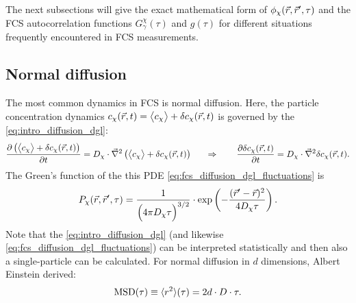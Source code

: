 The next subsections will give the exact mathematical form of $\phi_\chi(\vec{r},\vec{r}',\tau)$ and the FCS autocorrelation functions $G_{\gamma}^{\chi}(\tau)$ and $g(\tau)$ for different situations frequently encountered in FCS measurements.



\subsection{Normal diffusion}
\label{sec:NormalDiffusionFCS}
The most common dynamics in FCS is normal diffusion. Here, the particle concentration dynamics $c_\chi(\vec{r},t)=\bigl\langle c_\chi\bigr\rangle+\delta c_\chi(\vec{r},t)$ is governed by the  \eqref{eq:intro_diffusion_dgl}:
\begin{equation}\label{eq:fcs_diffusion_dgl_fluctuations}  
  \frac{\partial \left(\bigl\langle c_\chi\bigr\rangle+\delta c_\chi(\vec{r}, t)\right)}{\partial t}=D_\chi\cdot \vec{\nabla}^2\left(\bigl\langle c_\chi\bigr\rangle+\delta c_\chi(\vec{r}, t)\right)\ \ \ \ \ \Rightarrow\ \ \ \ \ \ \frac{\partial \delta c_\chi(\vec{r}, t)}{\partial t}=D_\chi\cdot \vec{\nabla}^2\delta c_\chi(\vec{r}, t).
\end{equation}
The Green's function of the this PDE \eqref{eq:fcs_diffusion_dgl_fluctuations} is
\begin{equation}\label{eq:fcs_ndiff_propagator}
  P_\chi(\vec{r},\vec{r}',\tau)=\frac{1}{\Bigl(4\pi D_\chi\tau\Bigr)^{3/2}}\cdot\exp\left(-\frac{(\vec{r}'-\vec{r})^2}{4D_\chi\tau}\right).
\end{equation}
Note that the  \eqref{eq:intro_diffusion_dgl} (and likewise \eqref{eq:fcs_diffusion_dgl_fluctuations}) can be interpreted statistically and then also a single-particle  can be calculated. For normal diffusion in $d$ dimensions, Albert Einstein derived:
\begin{equation}\label{eq:msd_normal_diffusion}
  \operatorname{MSD}(\tau)\equiv\langle r^2\rangle(\tau)=2d\cdot D\cdot\tau.
\end{equation}


